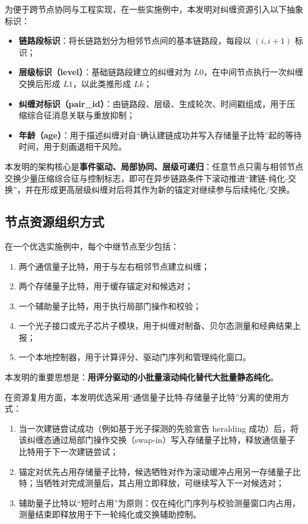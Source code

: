 \documentclass[12pt,a4paper]{article}
\begin{document}
为便于跨节点协同与工程实现，在一些实施例中，本发明对纠缠资源引入以下抽象标识：
\begin{itemize}[noitemsep]
    \item \textbf{链路段标识}：将长链路划分为相邻节点间的基本链路段，每段以 $(i,i+1)$ 标识；
    \item \textbf{层级标识（level）}：基础链路段建立的纠缠对为 $L0$，在中间节点执行一次纠缠交换后形成 $L1$，以此类推形成 $Lk$；
    \item \textbf{纠缠对标识（pair\_id）}：由链路段、层级、生成轮次、时间戳组成，用于压缩综合征消息关联与重放抑制；
    \item \textbf{年龄（age）}：用于描述纠缠对自“确认建链成功并写入存储量子比特”起的等待时间，用于刻画退相干风险。
\end{itemize}

本发明的架构核心是\textbf{事件驱动、局部协同、层级可递归}：任意节点只需与相邻节点交换少量压缩综合征与控制标志，即可在异步链路条件下滚动推进“建链-纯化-交换”，并在形成更高层级纠缠对后将其作为新的锚定对继续参与后续纯化/交换。

\subsection{节点资源组织方式}

在一个优选实施例中，每个中继节点至少包括：
\begin{enumerate}[label=(\arabic*)]
    \item 两个通信量子比特，用于与左右相邻节点建立纠缠；
    \item 两个存储量子比特，用于缓存锚定对和候选对；
    \item 一个辅助量子比特，用于执行局部门操作和校验；
    \item 一个光子接口或光子芯片子模块，用于纠缠对制备、贝尔态测量和经典结果上报；
    \item 一个本地控制器，用于计算评分、驱动门序列和管理纯化窗口。
\end{enumerate}

本发明的重要思想是：\textbf{用评分驱动的小批量滚动纯化替代大批量静态纯化}。

在资源复用方面，本发明优选采用“通信量子比特-存储量子比特”分离的使用方式：
\begin{enumerate}[label=(\arabic*)]
    \item 当一次建链尝试成功（例如基于光子探测的先验宣告 heralding 成功）后，将该纠缠态通过局部门操作交换（swap-in）写入存储量子比特，释放通信量子比特用于下一次建链尝试；
    \item 锚定对优先占用存储量子比特，候选牺牲对作为滚动缓冲占用另一存储量子比特；当牺牲对完成测量后，其占用立即释放，可继续写入下一对候选对；
    \item 辅助量子比特以“短时占用”为原则：仅在纯化门序列与校验测量窗口内占用，测量结束即释放用于下一轮纯化或交换辅助控制。
\end{enumerate}
\end{document}

